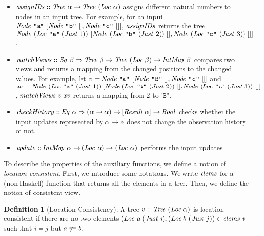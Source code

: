 \documentclass{article}
\theoremstyle{definition}
\newtheorem{definition}{Definition}
\newcommand{\texteq}{\mathrel{\texttt{==}}}
\begin{document}
\begin{itemize}
 \item $\mathit{assignIDs} :: \mathit{Tree}~\alpha \to \mathit{Tree}~(\mathit{Loc}~\alpha)$
   assigns different natural numbers to nodes in an input tree. For example, 
   for an input $\mathit{Node}~\texttt{"a"}~[\mathit{Node}~\texttt{"b"}~[], \mathit{Node}~\texttt{"c"}~[]]$, $\mathit{assignIDs}$ returns the tree 
   $\mi{Node}~(\mi{Loc}~\texttt{"a"}\ (\mi{Just}~1))\ \allowbreak[\mi{Node}~(\mi{Loc}~\texttt{"b"}~(\mi{Just}~2))~[], \mi{Node}\ (\mi{Loc}\ \texttt{"c"}\ (\mi{Just}~3))~[]]$.
 \item $\mathit{matchViews} :: \mathit{Eq}~\beta \Rightarrow \mathit{Tree}~\beta \to \mathit{Tree}~(\mathit{Loc}~\beta) \to \mathit{IntMap}~\beta$ compares two views and returns a mapping from the changed positions to the changed values.
   For example, let $v = \mathit{Node}~\texttt{"a"}~[\mathit{Node}~\texttt{"B"}~[], \mathit{Node}~\texttt{"c"}~[]]$ and $\mathit{xv} = \mathit{Node}~(\mathit{Loc}~\texttt{"a"}~(\mathit{Just}~1))~[\mathit{Node}~(\mathit{Loc}~\texttt{"b"}~(\mathit{Just}~2))~[], \mathit{Node}~(\mathit{Loc}~\texttt{"c"}~(\mathit{Just}~3))~[]]$, $\mathit{matchViews}~v~\mathit{xv}$ returns a mapping from $2$ to $\texttt{"B"}$.
 \item $\mathit{checkHistory} :: \mathit{Eq}~\alpha \Rightarrow (\alpha \to \alpha) \to [\mathit{Result}~\alpha] \to \mathit{Bool}$ checks whether the input updates represented by $\alpha \to \alpha$ does not change the observation history or not. 
 \item $\mathit{update} :: \mathit{IntMap}~\alpha \to (\mathit{Loc}~\alpha) \to (\mathit{Loc}~\alpha)$ performs the input updates.
\end{itemize}

To describe the properties of the auxiliary functions, we define a notion of
\emph{location-consistent}. First, we introduce some notations. We write $\mathit{elems}$ for a (non-Haskell) function that returns all the elements in a tree. 
Then, we define the notion of consistent view. 
\begin{definition}[Location-Consistency]
A tree $v :: \mathit{Tree}~(\mathit{Loc}~\alpha)$ is location-consistent if 
there are no two elements $(\mathit{Loc}~a~(\mathit{Just}~i), (\mathit{Loc}~b~(\mathit{Just}~j)) \in \mathit{elems}~v$ such that $i = j$ but $a \not\texteq b$.
\end{definition}
\end{document}
